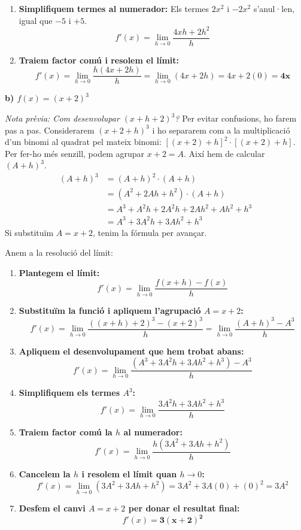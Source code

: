 \documentclass[12pt,a4paper]{article}
\begin{document}
\begin{enumerate}[label=\textbf{\arabic*.}]
\begin{enumerate}
    \item \textbf{Simplifiquem termes al numerador:}
    Els termes $2x^2$ i $-2x^2$ s'anul·len, igual que $-5$ i $+5$.
    \[ f'(x) = \lim_{h \to 0} \frac{4xh + 2h^2}{h} \]
    
    \item \textbf{Traiem factor comú i resolem el límit:}
    \[ f'(x) = \lim_{h \to 0} \frac{h(4x + 2h)}{h} = \lim_{h \to 0} (4x + 2h) = 4x + 2(0) = \mathbf{4x} \]
\end{enumerate}


\vspace{0.5cm}
\textbf{b) $f(x) = (x + 2)^3$}

\textit{Nota prèvia: Com desenvolupar $(x+h+2)^3$?}
Per evitar confusions, ho farem pas a pas. Considerarem $(x+2+h)^3$ i ho separarem com a la multiplicació d'un binomi al quadrat pel mateix binomi: $[(x+2)+h]^2 \cdot [(x+2)+h]$. 
Per fer-ho més senzill, podem agrupar $x+2 = A$. Així hem de calcular $(A+h)^3$.
\begin{align*}
(A+h)^3 &= (A+h)^2 \cdot (A+h) \\
&= (A^2 + 2Ah + h^2) \cdot (A+h) \\
&= A^3 + A^2h + 2A^2h + 2Ah^2 + Ah^2 + h^3 \\
&= A^3 + 3A^2h + 3Ah^2 + h^3
\end{align*}
Si substituïm $A = x+2$, tenim la fórmula per avançar. 

Anem a la resolució del límit:

\begin{enumerate}
    \item \textbf{Plantegem el límit:}
    \[ f'(x) = \lim_{h \to 0} \frac{f(x+h) - f(x)}{h} \]
    
    \item \textbf{Substituïm la funció i apliquem l'agrupació $A = x+2$:}
    \[ f'(x) = \lim_{h \to 0} \frac{((x+h)+2)^3 - (x+2)^3}{h} = \lim_{h \to 0} \frac{(A+h)^3 - A^3}{h} \]
    
    \item \textbf{Apliquem el desenvolupament que hem trobat abans:}
    \[ f'(x) = \lim_{h \to 0} \frac{(A^3 + 3A^2h + 3Ah^2 + h^3) - A^3}{h} \]
    
    \item \textbf{Simplifiquem els termes $A^3$:}
    \[ f'(x) = \lim_{h \to 0} \frac{3A^2h + 3Ah^2 + h^3}{h} \]
    
    \item \textbf{Traiem factor comú la $h$ al numerador:}
    \[ f'(x) = \lim_{h \to 0} \frac{h(3A^2 + 3Ah + h^2)}{h} \]
    
    \item \textbf{Cancelem la $h$ i resolem el límit quan $h \to 0$:}
    \[ f'(x) = \lim_{h \to 0} (3A^2 + 3Ah + h^2) = 3A^2 + 3A(0) + (0)^2 = 3A^2 \]
    
    \item \textbf{Desfem el canvi $A = x+2$ per donar el resultat final:}
    \[ f'(x) = \mathbf{3(x+2)^2} \]
\end{enumerate}
\end{enumerate}
\end{document}
